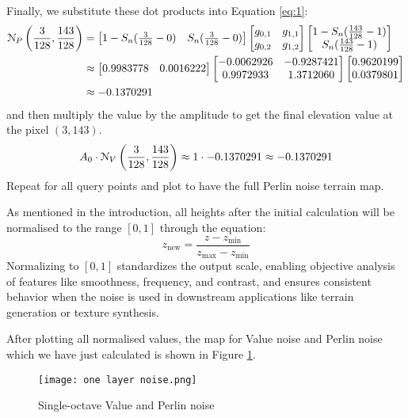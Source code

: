 Finally, we substitute these dot products into Equation \ref{eq:1}:
\begin{align*}
    \EuScript{N}_P\left(\frac{3}{128},\frac{143}{128}\right)&=
    \begin{bmatrix}
        1-S_n(\frac{3}{128}-0) & S_n(\frac{3}{128}-0)
    \end{bmatrix}
    \begin{bmatrix}
        g_{0,1} & g_{1,1}\\
        g_{0,2} & g_{1,2}
    \end{bmatrix}
    \begin{bmatrix}
        1-S_n(\frac{143}{128}-1)\\
        S_n(\frac{143}{128}-1)
    \end{bmatrix}\\
    &\approx
    \begin{bmatrix}
        0.9983778 & 0.0016222
    \end{bmatrix}
    \begin{bmatrix}
        -0.0062926 & -0.9287421\\
        0.9972933 & 1.3712060
    \end{bmatrix}
    \begin{bmatrix}
        0.9620199\\
        0.0379801
    \end{bmatrix}\\
    &\approx -0.1370291
\end{align*}
and then multiply the value by the amplitude to get the final elevation value at the pixel $(3,143)$.
\[A_0\cdot\EuScript{N}_V\left(\frac{3}{128},\frac{143}{128}\right)\approx1\cdot-0.1370291\approx-0.1370291\]
Repeat for all query points and plot to have the full Perlin noise terrain map.

As mentioned in the introduction, all heights after the initial calculation will be normalised to the range $[0,1]$ through the equation:
\[z_{\text{new}}=\frac{z-z_{\text{min}}}{z_{\text{max}}-z_{\text{min}}}\]
Normalizing to $[0,1]$ standardizes the output scale, enabling objective analysis of features like smoothness, 
frequency, and contrast, and ensures consistent behavior when the noise is used in downstream applications like terrain generation or 
texture synthesis.

After plotting all normalised values, the map for Value noise and Perlin noise which we have just calculated is shown in Figure \ref{fig:single}.

\begin{figure}[H]
    \centering
    \texttt{[image: one layer noise.png]}
    \caption{Single-octave Value and Perlin noise}
    \label{fig:single}
\end{figure}

